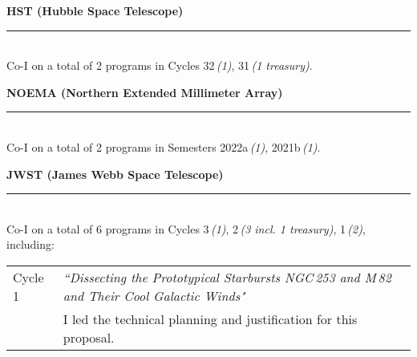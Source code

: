 \documentclass[11pt]{article}
\makeatletter
\def\vhrulefill#1{\leavevmode\leaders\hrule \@height #1\hfill \kern\z@}
\newcommand{\subsectionname}[1]{{\large\bf #1 \vhrulefill{0.5pt}}}
\makeatother
\begin{document}
\subsectionname{HST \textmd{\small (Hubble Space Telescope)}}\\
Co-I on a total of 2 programs in Cycles 32\,{\em(1)}, 31\,{\em(1 treasury)}.\medskip


\subsectionname{NOEMA \textmd{\small (Northern Extended Millimeter Array)}}\\
Co-I on a total of 2 programs in Semesters 2022a\,{\em(1)}, 2021b\,{\em(1)}.\medskip


\subsectionname{JWST \textmd{\small (James Webb Space Telescope)}}\\
Co-I on a total of  6 programs in Cycles 3\,{\em(1)}, 2\,{\em(3 incl. 1 treasury)}, 1\,{\em(2)}, including:
\vspace{-9pt}
\begin{longtable}{p{}p{}}
Cycle 1 &  \textit{``Dissecting the Prototypical Starbursts NGC\,253 and M\,82 and Their Cool Galactic Winds"}\\
& {\small I led the technical planning and justification for this proposal.}\medskip
\end{longtable}
\vspace{-15pt}
\end{document}
